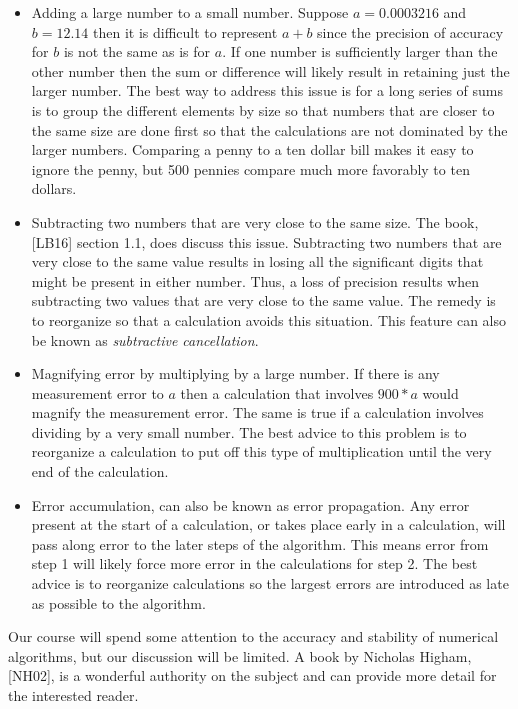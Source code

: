 \documentclass[twoside]{article}
\renewcommand{\cite}[1]{[#1]}
\begin{document}
\begin{itemize}
\item  Adding a large number to a small number. Suppose $a=0.0003216$ and $b=12.14$ then it is difficult to represent $a+b$ since the precision of accuracy for $b$ is not the same as is for $a$. If one number is sufficiently larger than the other number then the sum or difference will likely result in retaining just the larger number. The best way to address this issue is for a long series of sums is to group the different elements by size so that numbers that are closer to the same size are done first so that the calculations are not dominated by the larger numbers. Comparing a penny to a ten dollar bill makes it easy to ignore the penny, but 500 pennies compare much more favorably to ten dollars.

\item  Subtracting two numbers that are very close to the same size. The book, \cite{LB16} section 1.1, does discuss this issue. Subtracting two numbers that are very close to the same value results in losing all the significant digits that might be present in either number. Thus, a loss of precision results when subtracting two values that are very close to the same value. The remedy is to reorganize so that a calculation avoids this situation. This feature can also be known as {\it subtractive cancellation}. 

\item Magnifying error by multiplying by a large number. If there is any measurement error to $a$ then a calculation that involves $900*a$ would magnify the measurement error. The same is true if a calculation involves dividing by a very small number. The best advice to this problem is to reorganize a calculation to put off this type of multiplication until the very end of the calculation. 

\item Error accumulation, can also be known as error propagation. Any error present at the start of a calculation, or takes place early in a calculation, will pass along error to the later steps of the algorithm. This means error from step 1 will likely force more error in the calculations for step 2. The best advice is to reorganize calculations so the largest errors are introduced as late as possible to the algorithm.  
\end{itemize}
Our course will spend some attention to the accuracy and stability of numerical algorithms, but our discussion will be  limited. A book by Nicholas Higham, \cite{NH02}, is a wonderful authority on the subject and can provide more detail for the interested reader.
\end{document}
